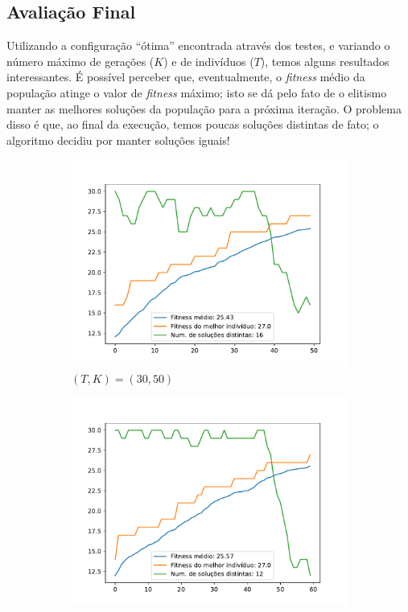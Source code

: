 \documentclass[11pt,a4paper]{article}
\begin{document}
\subsection{Avaliação Final\label{avfin}}
Utilizando a configuração ``ótima'' encontrada através dos testes, e variando o número máximo de gerações ($K$) e de indivíduos ($T$), temos alguns resultados interessantes. É possível perceber que, eventualmente, o \textit{fitness} médio da população atinge o valor de \textit{fitness} máximo; isto se dá pelo fato de o elitismo manter as melhores soluções da população para a próxima iteração. O problema disso é que, ao final da execução, temos poucas soluções distintas de fato; o algoritmo decidiu por manter soluções iguais!

\begin{figure}[!hb]
	\begin{subfigure}[b]{0.33\textwidth}
		\centering
		\includegraphics[width=\textwidth]{teste6_30_50.pdf}
		\caption{$(T,K)=(30,50)$}
	\end{subfigure}%
	\begin{subfigure}[b]{0.33\textwidth}
		\centering
		\includegraphics[width=\textwidth]{teste6_30_60.pdf}

\end{subfigure}
\end{figure}
\end{document}
